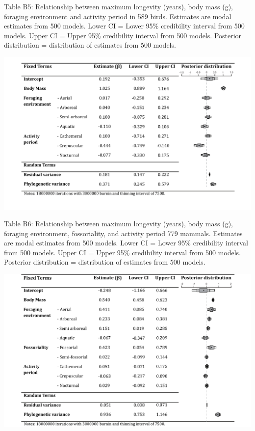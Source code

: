 \begin{table}[!h]
  \caption[ ]{Table B5: Relationship between maximum longevity (years), body mass (g), foraging environment and activity period in 589 birds. Estimates are modal estimates from 500 models. Lower CI = Lower 95\% credibility interval from 500 models. Upper CI = Upper 95\% credibility interval from 500 models. Posterior distribution = distribution of estimates from 500 models.}
  \label{tbl:Table B5.}
  \includegraphics[width=\linewidth]{ch3-longevity-appendix/Table_B5.pdf}
\end{table}


\begin{table}[!h]
  \caption[ ]{Table B6: Relationship between maximum longevity (years), body mass (g), foraging environment, fossoriality, and activity period 779 mammals. Estimates are modal estimates from 500 models. Lower CI = Lower 95\% credibility interval from 500 models. Upper CI = Upper 95\% credibility interval from 500 models. Posterior distribution = distribution of estimates from 500 models.}
  \label{tbl:Table B9.}
  \includegraphics[width=\linewidth]{ch3-longevity-appendix/Table_B6.pdf}
\end{table}



%
%

